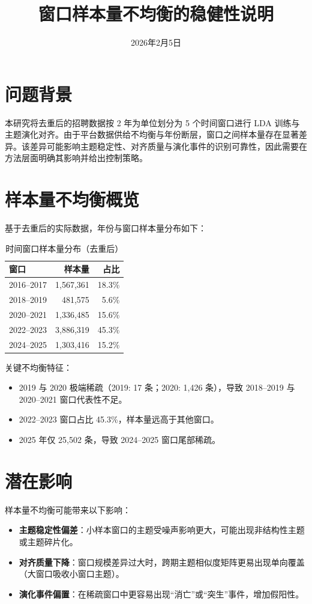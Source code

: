 \documentclass[11pt,a4paper]{article}
\title{\textbf{窗口样本量不均衡的稳健性说明}}
\date{2026年2月5日}
\begin{document}
\maketitle

\section{问题背景}

本研究将去重后的招聘数据按 2 年为单位划分为 5 个时间窗口进行 LDA 训练与主题演化对齐。由于平台数据供给不均衡与年份断层，窗口之间样本量存在显著差异。该差异可能影响主题稳定性、对齐质量与演化事件的识别可靠性，因此需要在方法层面明确其影响并给出控制策略。

\section{样本量不均衡概览}

基于去重后的实际数据，年份与窗口样本量分布如下：

\begin{table}[h]
\centering
\begin{tabular}{lrr}
\toprule
\textbf{窗口} & \textbf{样本量} & \textbf{占比} \\
\midrule
2016--2017 & 1,567,361 & 18.3\% \\
2018--2019 & 481,575 & 5.6\% \\
2020--2021 & 1,336,485 & 15.6\% \\
2022--2023 & 3,886,319 & 45.3\% \\
2024--2025 & 1,303,416 & 15.2\% \\
\bottomrule
\end{tabular}
\caption{时间窗口样本量分布（去重后）}
\end{table}

关键不均衡特征：
\begin{itemize}
    \item 2019 与 2020 极端稀疏（2019: 17 条；2020: 1,426 条），导致 2018--2019 与 2020--2021 窗口代表性不足。
    \item 2022--2023 窗口占比 45.3\%，样本量远高于其他窗口。
    \item 2025 年仅 25,502 条，导致 2024--2025 窗口尾部稀疏。
\end{itemize}

\section{潜在影响}

样本量不均衡可能带来以下影响：
\begin{itemize}
    \item \textbf{主题稳定性偏差}：小样本窗口的主题受噪声影响更大，可能出现非结构性主题或主题碎片化。
    \item \textbf{对齐质量下降}：窗口规模差异过大时，跨期主题相似度矩阵更易出现单向覆盖（大窗口吸收小窗口主题）。
    \item \textbf{演化事件偏置}：在稀疏窗口中更容易出现“消亡”或“突生”事件，增加假阳性。
\end{itemize}
\end{document}
